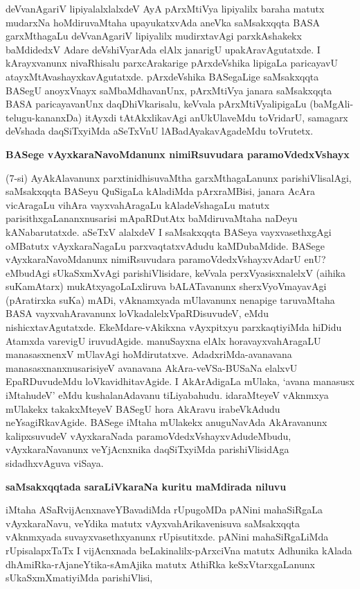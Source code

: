 deVvanAgariV lipiyalalxlalxdeV AyA pArxMtiVya lipiyalilx baraha matutx mudarxNa hoMdiruvaMtaha upayukatxvAda aneVka saMsakxqqta BASA garxMthagaLu deVvanAgariV lipiyalilx mudirxtavAgi parxkAshakekx baMdidedxV Adare deVshiVyarAda elAlx janarigU upakAravAgutatxde. I kArayxvanunx nivaRhisalu parxcArakarige pArxdeVshika lipigaLa paricayavU atayxMtAvashayxkavAgutatxde. pArxdeVshika BASegaLige saMsakxqqta BASegU anoyxVnayx saMbaMdhavanUnx, pArxMtiVya janara saMsakxqqta BASA paricayavanUnx daqDhiVkarisalu, keVvala pArxMtiVyalipigaLu (baMgAli-telugu-kananxDa) itAyxdi tAtAkxlikavAgi anUkUlaveMdu toVridarU, sama\-garx deVshada daqSiTxyiMda aSeTxVnU lABadAyakavAgadeMdu toVrutetx.

\textbf{BASege vAyxkaraNavoMdanunx nimiRsuvudara paramoVdedxVshayx}

(7-si) AyAkAlavanunx parxtinidhisuvaMtha garxMthagaLanunx parishiVlisalAgi, saMsakxqqta BASeyu QuSigaLa kAladiMda pArxraMBisi, janara AcAra vicAragaLu vihAra vayxvahAragaLu kAladeVshagaLu matutx parisithxgaLananxnusarisi mApaRDutAtx baMdiruvaMtaha naDeyu kANabarutatxde. aSeTxV alalxdeV I saMsakxqqta BASeya vayxvasethxgAgi oMBatutx vAyxkaraNagaLu parxvaqtatxvAdudu kaMDubaMdide. BASege vAyxkaraNavoMdanunx nimiRsuvudara paramoVdedxVshayxvAdarU enU? eMbudAgi 
sUkaSxmXvAgi parishiVlisidare, keVvala perxVyasisxnalelxV (aihika suKamAtarx) mukAtxyagoLaLxliruva bALATavanunx sherxVyoVmayavAgi (pAratirxka suKa) mADi, vAknamxyada mUlavanunx nenapige taruvaMtaha BASA vayxvahAravanunx loVkadalelxVpaRDisuvudeV, eMdu nishicxtavAgutatxde. EkeMdare-vAkikxna vAyxpitxyu parxkaqtiyiMda hiDidu Atamxda varevigU iruvudAgide. manuSayxna elAlx horavayxvahAragaLU manasasxnenxV mUlavAgi hoMdirutatxve. AdadxriMda-avanavana manasasxnanxnusarisiyeV avanavana AkAra-veVSa-BUSaNa elalxvU EpaRDuvudeMdu loVkavidhitavAgide. I AkArAdigaLa mUlaka, `avana manasusx iMtahudeV' eMdu kushalanAdavanu tiLiyabahudu. idaraMteyeV vAknmxya mUlakekx takakxMteyeV BASegU hora AkAravu irabeVkAdudu neYsagiRkavAgide. BASege iMtaha mUlakekx anuguNavAda AkAravanunx kalipxsuvudeV vAyxkaraNada paramoVdedxVshayxvAdudeMbudu, vAyxkaraNavanunx veYjAcnxnika daqSiTxyiMda parishiVlisidAga sidadhxvAguva viSaya.

\textbf{saMsakxqqtada saraLiVkaraNa kuritu maMdirada niluvu}

iMtaha ASaRvijAcnxnaveYBavadiMda rUpugoMDa pANini mahaSiRgaLa vAyxkaraNavu, veYdika matutx vAyxvahArikavenisuva saMsakxqqta vAknmxyada suvayxvasethxyanunx rUpisutitxde. pANini mahaSiRgaLiMda rUpisalapxTaTx I vijAcnxnada beLakinalilx-pArxciVna matutx Adhunika kAlada dhAmiRka-rAjaneYtika-sAmAjika matutx AthiRka keSxVtarxgaLanunx sUkaSxmXmatiyiMda parishiVlisi,

